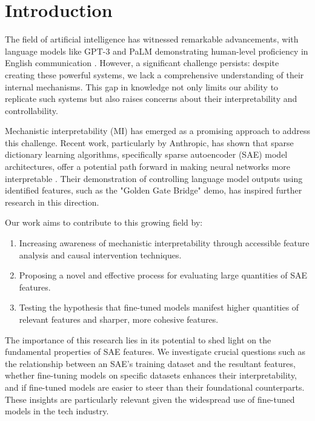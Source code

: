 \section{Introduction}

The field of artificial intelligence has witnessed remarkable advancements, with language models like GPT-3 and PaLM demonstrating human-level proficiency in English communication \cite{sample2023}. However, a significant challenge persists: despite creating these powerful systems, we lack a comprehensive understanding of their internal mechanisms. This gap in knowledge not only limits our ability to replicate such systems but also raises concerns about their interpretability and controllability.

Mechanistic interpretability (MI) has emerged as a promising approach to address this challenge. Recent work, particularly by Anthropic, has shown that sparse dictionary learning algorithms, specifically sparse autoencoder (SAE) model architectures, offer a potential path forward in making neural networks more interpretable \cite{anthropic2023}. Their demonstration of controlling language model outputs using identified features, such as the "Golden Gate Bridge" demo, has inspired further research in this direction.

Our work aims to contribute to this growing field by:

\begin{enumerate}
    \item Increasing awareness of mechanistic interpretability through accessible feature analysis and causal intervention techniques.
    \item Proposing a novel and effective process for evaluating large quantities of SAE features.
    \item Testing the hypothesis that fine-tuned models manifest higher quantities of relevant features and sharper, more cohesive features.
\end{enumerate}

The importance of this research lies in its potential to shed light on the fundamental properties of SAE features. We investigate crucial questions such as the relationship between an SAE's training dataset and the resultant features, whether fine-tuning models on specific datasets enhances their interpretability, and if fine-tuned models are easier to steer than their foundational counterparts. These insights are particularly relevant given the widespread use of fine-tuned models in the tech industry.

